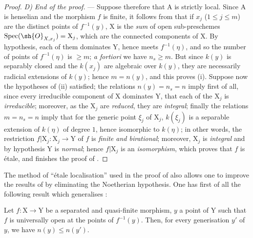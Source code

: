\begin{proof}
\emph{D) End of the proof.} ---
Suppose therefore that $\mathrm{A}$ is strictly local.
Since $\mathrm{A}$ is henselian and the morphism $f$ is finite, it follows from  that if $x_j$ ($1\leq j\leq m$) are the distinct points of $f^{-1}(y)$, $\mathrm{X}$ is the \emph{sum} of open sub-preschemes $\operatorname{Spec}(\sh{O}_{X,x_j})=\mathrm{X}_j$, which are the connected components of $\mathrm{X}$.
By hypothesis, each of them dominates $\mathrm{Y}$, hence meets $f^{-1}(\eta)$, and so the number of points of $f^{-1}(\eta)$ is $\geq m$; \emph{a fortiori} we have $n_s\geq m$.
But since $k(y)$ is separably closed and the $k(x_j)$ are algebraic over $k(y)$, they are necessarily radicial extensions of $k(y)$; hence $m=n(y)$, and this proves (i).
Suppose now the hypotheses of (ii) satisfied; the relations $n(y)=n_s=n$ imply first of all, since every irreducible component of $\mathrm{X}$ dominates $\mathrm{Y}$, that each of the $\mathrm{X}_j$ is \emph{irreducible}; moreover, as the $\mathrm{X}_j$ are \emph{reduced}, they are \emph{integral}; finally the relations $m=n_s=n$ imply that for the generic point $\xi_j$ of $\mathrm{X}_j$, $k(\xi_j)$ is a separable extension of $k(\eta)$ of degree $1$, hence isomorphic to $k(\eta)$; in other words, the restriction $f|\mathrm{X}_j:\mathrm{X}_j\to\mathrm{Y}$ of $f$ is \emph{finite and birational}; moreover, $\mathrm{X}_j$ is \emph{integral} and by hypothesis $\mathrm{Y}$ is \emph{normal}; hence  $f|\mathrm{X}_j$ is an \emph{isomorphism}, which proves that $f$ is \'etale, and finishes the proof of .
\end{proof}

\begin{remark}[18.10.17]
\label{IV.18.10.17}
The method of ``\'etale localisation'' used in the proof of  also allows one to improve the results of  by eliminating the Noetherian hypothesis.
One has first of all the following result which generalises :
\end{remark}

\begin{env}[18.10.17.1]
\label{IV.18.10.17.1}
Let $f:\mathrm{X}\to\mathrm{Y}$ be a separated and quasi-finite morphism, $y$ a point of $\mathrm{Y}$ such that $f$ is universally open at the points of $f^{-1}(y)$.
Then, for every generisation $y'$ of $y$, we have $n(y)\leq n(y')$.
\end{env}

